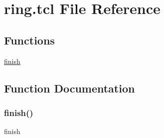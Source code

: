 \hypertarget{ring_8tcl}{}\section{ring.\+tcl File Reference}
\label{ring_8tcl}
\subsection*{Functions}
\begin{DoxyCompactItemize}
\item 
\hyperlink{ring_8tcl_a30728837c246b65ef76298af0101d99c}{finish}
\end{DoxyCompactItemize}


\subsection{Function Documentation}
\mbox{\label{ring_8tcl_a30728837c246b65ef76298af0101d99c}} 
\subsubsection{\texorpdfstring{finish()}{finish()}}
{\footnotesize\ttfamily finish}

